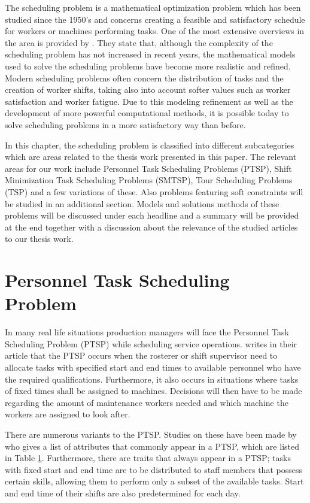 
The scheduling problem is a mathematical optimization problem which has been studied since the 1950's and concerns creating a feasible and satisfactory schedule for workers or machines performing tasks. One of the most extensive overviews in the area is provided by \citet{ernst_2004}. They state that, although the complexity of the scheduling problem has not increased in recent years, the mathematical models used to solve the scheduling problems have become more realistic and refined. Modern scheduling problems often concern the distribution of tasks and the creation of worker shifts, taking also into account softer values such as worker satisfaction and worker fatigue. Due to this modeling refinement as well as the development of more powerful computational methods, it is possible today to solve scheduling problems in a more satisfactory way than before.

In this chapter, the scheduling problem is classified into different subcategories which are areas related to the thesis work presented in this paper. The relevant areas for our work include Personnel Task Scheduling Problems (PTSP), Shift Minimization Task Scheduling Problems (SMTSP), Tour Scheduling Problems (TSP) and a few variations of these. Also problems featuring soft constraints will be studied in an additional section. Models and solutions methods of these problems will be discussed under each headline and a summary will be provided at the end together with a discussion about the relevance of the studied articles to our thesis work.


\section{Personnel Task Scheduling Problem} \label{PTSP}

In many real life situations production managers will face the Personnel Task Scheduling Problem (PTSP) while scheduling service operations. \citet{krishnamoorthy_2001} writes in their article that the PTSP occurs when the rosterer or shift supervisor need to allocate tasks with specified start and end times to available personnel who have the required qualifications. Furthermore, it also occurs in situations where tasks of fixed times shall be assigned to machines. Decisions will then have to be made regarding the amount of maintenance workers needed and which machine the workers are assigned to look after.

There are numerous variants to the PTSP. Studies on these have been made by \citet{krishnamoorthy_2001} who gives a list of attributes that commonly appear in a PTSP, which are listed in Table \ref{PTSP}. Furthermore, there are traits that always appear in a PTSP; tasks with fixed start and end time are to be distributed to staff members that possess certain skills, allowing them to perform only a subset of the available tasks. Start and end time of their shifts are also predetermined for each day.


